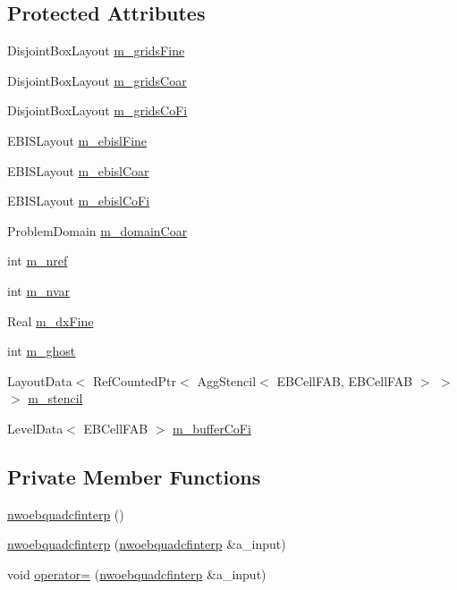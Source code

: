 \subsection*{Protected Attributes}
\begin{DoxyCompactItemize}
\item 
Disjoint\+Box\+Layout \hyperlink{classnwoebquadcfinterp_ac3ef73d072197f116ce498bec5d28637}{m\+\_\+grids\+Fine}
\item 
Disjoint\+Box\+Layout \hyperlink{classnwoebquadcfinterp_a48916b7af00c345229f5c41b5382c91f}{m\+\_\+grids\+Coar}
\item 
Disjoint\+Box\+Layout \hyperlink{classnwoebquadcfinterp_aab63ef9fc22a60ffecb74f7f916e2422}{m\+\_\+grids\+Co\+Fi}
\item 
E\+B\+I\+S\+Layout \hyperlink{classnwoebquadcfinterp_ad8747e5d6dcb3613235df12c5a72f51a}{m\+\_\+ebisl\+Fine}
\item 
E\+B\+I\+S\+Layout \hyperlink{classnwoebquadcfinterp_a49d4a5fcaf4fcf12714009d2c7eec3ac}{m\+\_\+ebisl\+Coar}
\item 
E\+B\+I\+S\+Layout \hyperlink{classnwoebquadcfinterp_a1af61857678e74133a95ec8fa9dcf49d}{m\+\_\+ebisl\+Co\+Fi}
\item 
Problem\+Domain \hyperlink{classnwoebquadcfinterp_a81c6feda61f3f2a1cd0f6b3c42b5e513}{m\+\_\+domain\+Coar}
\item 
int \hyperlink{classnwoebquadcfinterp_a2814bffc586d7cb9913d241379896025}{m\+\_\+nref}
\item 
int \hyperlink{classnwoebquadcfinterp_a36ee80e85ed928375f0ba2162ffe8511}{m\+\_\+nvar}
\item 
Real \hyperlink{classnwoebquadcfinterp_a92a63d0a83b16426c81b74f32c39629c}{m\+\_\+dx\+Fine}
\item 
int \hyperlink{classnwoebquadcfinterp_aa7bee9c12e43c2d6c435b6be497c1b22}{m\+\_\+ghost}
\item 
Layout\+Data$<$ Ref\+Counted\+Ptr$<$ Agg\+Stencil$<$ E\+B\+Cell\+F\+AB, E\+B\+Cell\+F\+AB $>$ $>$ $>$ \hyperlink{classnwoebquadcfinterp_a5b74c7be12aa17afebf582bb78ffadbc}{m\+\_\+stencil}
\item 
Level\+Data$<$ E\+B\+Cell\+F\+AB $>$ \hyperlink{classnwoebquadcfinterp_a04df0f05122e309194e9fb1d70912a04}{m\+\_\+buffer\+Co\+Fi}
\end{DoxyCompactItemize}
\subsection*{Private Member Functions}
\begin{DoxyCompactItemize}
\item 
\hyperlink{classnwoebquadcfinterp_a3d4a579e4e9af73233d35d4e2b949ec0}{nwoebquadcfinterp} ()
\item 
\hyperlink{classnwoebquadcfinterp_ad4eee57df2c0f5d7022c1590f529ba05}{nwoebquadcfinterp} (\hyperlink{classnwoebquadcfinterp}{nwoebquadcfinterp} \&a\+\_\+input)
\item 
void \hyperlink{classnwoebquadcfinterp_a03a8b6a2374a9072469fc5c1b81fd36d}{operator=} (\hyperlink{classnwoebquadcfinterp}{nwoebquadcfinterp} \&a\+\_\+input)
\end{DoxyCompactItemize}



